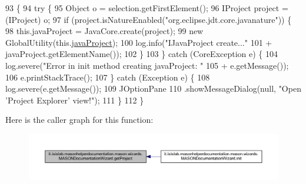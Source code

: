 \begin{DoxyCode}
93                                                             \{
94         \textcolor{keywordflow}{try} \{
95             Object o = selection.getFirstElement();
96             IProject project = (IProject) o;
97             \textcolor{keywordflow}{if} (project.isNatureEnabled(\textcolor{stringliteral}{"org.eclipse.jdt.core.javanature"})) \{
98                 this.javaProject = JavaCore.create(project);
99                 \textcolor{keyword}{new} GlobalUtility(this.\hyperlink{classit_1_1isislab_1_1masonhelperdocumentation_1_1mason_1_1wizards_1_1_m_a_s_o_n_documentation_wizard_ab4a56d14d946063217ce087d78f06210}{javaProject});
100                 log.info(\textcolor{stringliteral}{"IJavaProject create..."}
101                         + javaProject.getElementName());
102             \}
103         \} \textcolor{keywordflow}{catch} (CoreException e) \{
104             log.severe(\textcolor{stringliteral}{"Error in init method creating javaProject: "}
105                     + e.getMessage());
106             e.printStackTrace();
107         \} \textcolor{keywordflow}{catch} (Exception e) \{
108             log.severe(e.getMessage());
109             JOptionPane
110                     .showMessageDialog(null, \textcolor{stringliteral}{"Open 'Project Explorer' view!"});
111         \}
112     \}
\end{DoxyCode}


Here is the caller graph for this function\-:
\nopagebreak
\begin{figure}[H]
\begin{center}
\leavevmode
\includegraphics[width=350pt]{classit_1_1isislab_1_1masonhelperdocumentation_1_1mason_1_1wizards_1_1_m_a_s_o_n_documentation_wizard_a70caf610771efa8c826aaf0d8b1dafef_icgraph}
\end{center}
\end{figure}


